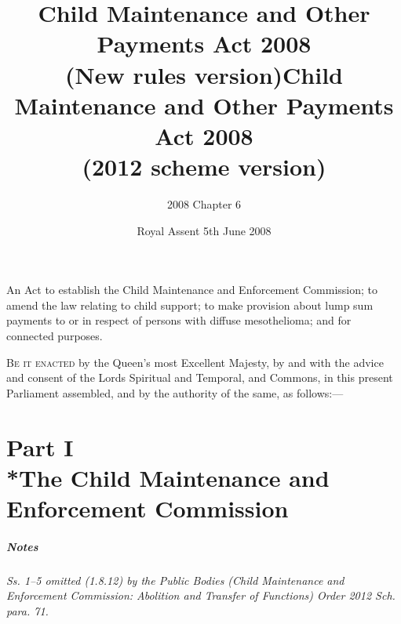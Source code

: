 \documentclass[a4paper]{article}
\title{Child Maintenance and Other Payments Act 2008\\(New rules version)}
\title{Child Maintenance and Other Payments Act 2008\\(2012 scheme version)}
\author{2008 Chapter 6}
\date{Royal Assent 5th June 2008}
\newcommand{\parthead}{}
\newcommand\amendment[1]{\subsubsection*{Notes}{\itshape\frenchspacing\footnotesize #1 \par}}
\begin{document}
\maketitle

\noindent
{\large An Act to establish the Child Maintenance and Enforcement Commission; to amend the law relating to child support; to make provision about lump sum payments to or in respect of persons with diffuse mesothelioma; and for connected purposes.}

\bigskip

\lettrine{B}{e it enacted} by the Queen’s most Excellent Majesty, by and with the advice and consent of the Lords Spiritual and Temporal, and Commons, in this present Parliament assembled, and by the authority of the same, as follows:—


{\sloppy

\tableofcontents

}

\setcounter{secnumdepth}{-2}

\part[Part I --- The Child Maintenance and Enforcement Commission]{Part I\\*The Child Maintenance and Enforcement Commission}

\renewcommand\parthead{--- Part I}

\amendment{
Ss. 1--5 omitted (1.8.12) by the Public Bodies (Child Maintenance and Enforcement Commission: Abolition and Transfer of Functions) Order 2012 Sch. para. 71.
}
\end{document}
